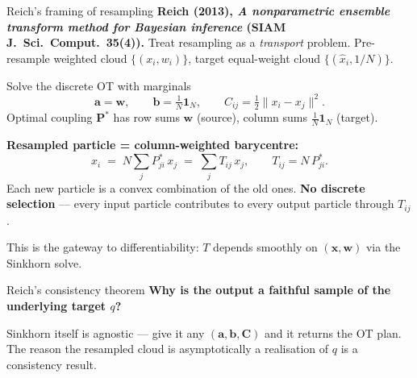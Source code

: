\documentclass[10pt,aspectratio=169]{beamer}
\begin{document}
\begin{frame}{Reich's framing of resampling}
  \textbf{Reich (2013), \emph{A nonparametric ensemble transform method for Bayesian inference} (SIAM J.\ Sci.\ Comput.\ 35(4)).} Treat resampling as a \emph{transport} problem. Pre-resample weighted cloud $\{(x_i, w_i)\}$, target equal-weight cloud $\{(\hat x_i, 1/N)\}$.

  \medskip
  Solve the discrete OT with marginals
  \[
    \mathbf{a} = \mathbf{w}, \qquad \mathbf{b} = \tfrac{1}{N}\mathbf{1}_N, \qquad C_{ij} = \tfrac{1}{2}\|x_i - x_j\|^2.
  \]
  Optimal coupling $\mathbf{P}^*$ has row sums $\mathbf{w}$ (source), column sums $\tfrac{1}{N}\mathbf{1}_N$ (target).

  \medskip
  \textbf{Resampled particle = column-weighted barycentre:}
  \[
    \hat x_i \;=\; N \sum_j P^*_{ji}\, x_j \;=\; \sum_j T_{ij}\, x_j,
    \qquad T_{ij} = N\, P^*_{ji}.
  \]
  Each new particle is a convex combination of the old ones. \textbf{No discrete selection} --- every input particle contributes to every output particle through $T_{ij}$.

  \medskip
  This is the gateway to differentiability: $T$ depends smoothly on $(\mathbf{x}, \mathbf{w})$ via the Sinkhorn solve.
\end{frame}

\begin{frame}{Reich's consistency theorem}
  \textbf{Why is the output a faithful sample of the underlying target $q$?}

  \medskip
  Sinkhorn itself is agnostic --- give it any $(\mathbf{a}, \mathbf{b}, \mathbf{C})$ and it returns the OT plan. The reason the resampled cloud is asymptotically a realisation of $q$ is a consistency result.

  \medskip
\end{frame}
\end{document}
